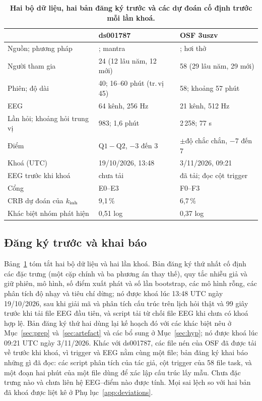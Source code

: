 \begin{table}[t]
\caption{\textbf{Hai bộ dữ liệu, hai bản đăng ký trước và các dự đoán cố định trước mỗi lần khoá.}}
\label{tab:datasets}
\centering\scriptsize
\setlength{\tabcolsep}{1pt}
\begin{tabular}{lll}
\toprule
 & ds001787 & OSF 3uszv \\
\midrule
Nguồn; phương pháp & \cite{Brandmeyer2018}; mantra & \cite{RodriguezLarios2021}; hơi thở \\
Người tham gia & 24 (12 lâu năm, 12 mới) & 58 (29 lâu năm, 29 mới) \\
Phiên; độ dài & 40; 16--60 phút (tr.\,vị 45) & 58; khoảng 57 phút \\
EEG & 64 kênh, 256 Hz & 21 kênh, 512 Hz \\
Lần hỏi; khoảng hỏi trung vị & 983; 1,6 phút & 2\,258; 77 s \\
Điểm & $\mathrm{Q1}-\mathrm{Q2}$, $-3$ đến $3$ & $\pm$độ chắc chắn, $-7$ đến $7$ \\
Khoá (UTC) & 19/10/2026, 13:48 & 3/11/2026, 09:21 \\
EEG trước khi khoá & chưa tải & đã tải; đọc cột trigger \\
Cổng & E0--E3 & F0--F3 \\
CRB dự đoán của $k_{\mathrm{inh}}$ & 9,1\,\% & 6,7\,\% \\
Khác biệt nhóm phát hiện & 0,51 log & 0,37 log \\
\bottomrule
\end{tabular}
\end{table}

\subsection{Đăng ký trước và khai báo}
\label{sec:prereg}
Bảng~\ref{tab:datasets} tóm tắt hai bộ dữ liệu và hai lần khoá. Bản đăng ký thứ nhất cố định các đặc trưng (một cặp chính và ba phương án thay thế), quy tắc nhiễu giả và giữ phiên, mô hình, số điểm xuất phát và số lần bootstrap, các mô hình rỗng, các phân tích độ nhạy và tiêu chí dừng; nó được khoá lúc 13:48 UTC ngày 19/10/2026, sau khi giải mã và phân tích cấu trúc trên lịch hỏi thật và 99 giây trước khi tải file EEG đầu tiên, và script tải từ chối file EEG khi chưa có khoá hợp lệ. Bản đăng ký thứ hai dùng lại kế hoạch đó với các khác biệt nêu ở Mục~\ref{sec:prep} và~\ref{sec:artefact} và các bổ sung ở Mục~\ref{sec:hyp}; nó được khoá lúc 09:21 UTC ngày 3/11/2026. Khác với ds001787, các file nén của OSF đã được tải về trước khi khoá, vì trigger và EEG nằm cùng một file; bản đăng ký khai báo những gì đã đọc: các script phân tích của tác giả, cột trigger của 58 file task, và một đoạn hai phút của một file dùng để xác lập cấu trúc lấy mẫu. Chưa đặc trưng nào và chưa liên hệ EEG--điểm nào được tính. Mọi sai lệch so với hai bản đã khoá được liệt kê ở Phụ lục~\ref{app:deviations}.


